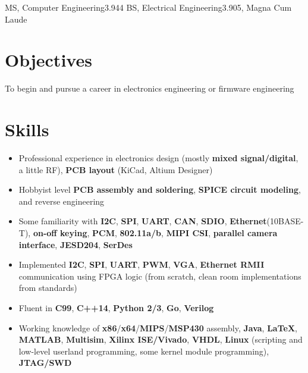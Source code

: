 \documentclass{my_resume}
\begin{document}

    {MS, Computer Engineering}{3.944}
	{BS, Electrical Engineering}{3.905, Magna Cum Laude}

\section{Objectives}
To begin and pursue a career in electronics engineering or firmware engineering

\section{Skills}
\begin{itemize}[noitemsep]
    \item Professional experience in electronics design (mostly \textbf{mixed signal/digital}, a little RF), \textbf{PCB layout} (KiCad, Altium Designer)
    \item Hobbyist level \textbf{PCB assembly and soldering}, \textbf{SPICE circuit modeling}, and reverse engineering
    \item Some familiarity with \textbf{I2C}, \textbf{SPI}, \textbf{UART}, \textbf{CAN}, \textbf{SDIO}, \textbf{Ethernet}(10BASE-T), \textbf{on-off keying}, \textbf{PCM}, \textbf{802.11a/b}, \textbf{MIPI CSI}, \textbf{parallel camera interface}, \textbf{JESD204}, \textbf{SerDes}
    \item Implemented \textbf{I2C}, \textbf{SPI}, \textbf{UART}, \textbf{PWM}, \textbf{VGA}, \textbf{Ethernet RMII} communication using FPGA logic (from scratch, clean room implementations from standards)
    \item Fluent in \textbf{C99}, \textbf{C++14}, \textbf{Python 2/3}, \textbf{Go}, \textbf{Verilog}
    \item Working knowledge of \textbf{x86}/\textbf{x64}/\textbf{MIPS}/\textbf{MSP430} assembly, \textbf{Java}, \textbf{LaTeX}, \textbf{MATLAB}, \textbf{Multisim}, \textbf{Xilinx ISE/Vivado}, \textbf{VHDL}, \textbf{Linux} (scripting and low-level userland programming, some kernel module programming), \textbf{JTAG/SWD}
\end{itemize}
\end{document}
